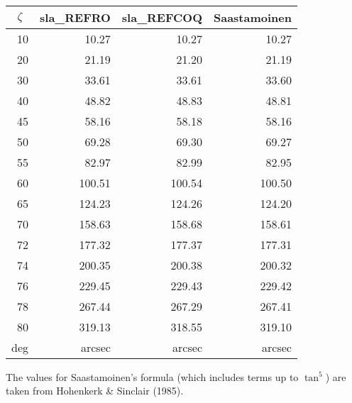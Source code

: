 \documentclass[11pt,twoside]{article}
\begin{document}
{\begin{enumerate}
        ~~~~~~~~~~
        \begin{tabular}{|r|r|r|r|} \hline
        \multicolumn{1}{|c}{$\zeta$} &
        \multicolumn{1}{|c}{sla\_REFRO} &
        \multicolumn{1}{|c}{sla\_REFCOQ} &
        \multicolumn{1}{|c|}{Saastamoinen} \\ \hline
        10 &  10.27 &  10.27 &  10.27 \\
        20 &  21.19 &  21.20 &  21.19 \\
        30 &  33.61 &  33.61 &  33.60 \\
        40 &  48.82 &  48.83 &  48.81 \\
        45 &  58.16 &  58.18 &  58.16 \\
        50 &  69.28 &  69.30 &  69.27 \\
        55 &  82.97 &  82.99 &  82.95 \\
        60 & 100.51 & 100.54 & 100.50 \\
        65 & 124.23 & 124.26 & 124.20 \\
        70 & 158.63 & 158.68 & 158.61 \\
        72 & 177.32 & 177.37 & 177.31 \\
        74 & 200.35 & 200.38 & 200.32 \\
        76 & 229.45 & 229.43 & 229.42 \\
        78 & 267.44 & 267.29 & 267.41 \\
        80 & 319.13 & 318.55 & 319.10 \\ \hline
        deg & arcsec & arcsec & arcsec \\ \hline
        \end{tabular}

        \vspace{3ex}

        The values for Saastamoinen's formula (which includes terms
        up to $\tan^5$) are taken from Hohenkerk \& Sinclair (1985).


\end{enumerate}}
\end{document}
